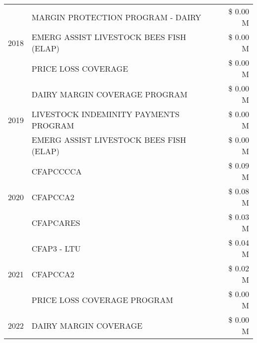 \begin{tabular}{llr}
\cline{1-3}
\multirow[t]{3}{*}{2018} & MARGIN PROTECTION PROGRAM - DAIRY & \$ 0.00 M \\
 & EMERG ASSIST LIVESTOCK BEES FISH (ELAP) & \$ 0.00 M \\
 & PRICE LOSS COVERAGE & \$ 0.00 M \\
\cline{1-3}
\multirow[t]{3}{*}{2019} & DAIRY MARGIN COVERAGE PROGRAM & \$ 0.00 M \\
 & LIVESTOCK INDEMINITY PAYMENTS PROGRAM & \$ 0.00 M \\
 & EMERG ASSIST LIVESTOCK BEES FISH (ELAP) & \$ 0.00 M \\
\cline{1-3}
\multirow[t]{3}{*}{2020} & CFAPCCCCA & \$ 0.09 M \\
 & CFAPCCA2 & \$ 0.08 M \\
 & CFAPCARES & \$ 0.03 M \\
\cline{1-3}
\multirow[t]{3}{*}{2021} & CFAP3 - LTU & \$ 0.04 M \\
 & CFAPCCA2 & \$ 0.02 M \\
 & PRICE LOSS COVERAGE PROGRAM & \$ 0.00 M \\
\cline{1-3}
2022 & DAIRY MARGIN COVERAGE & \$ 0.00 M \\
\cline{1-3}
\bottomrule
\end{tabular}
